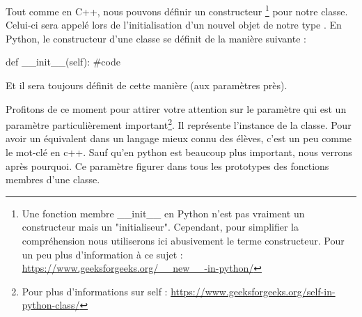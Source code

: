 Tout comme en C++, nous pouvons définir un constructeur
\footnote
{
Une fonction membre \_\_init\_\_ en Python n'est pas vraiment un constructeur mais un "initialiseur". Cependant, pour simplifier la compréhension nous utiliserons ici abusivement le terme constructeur. Pour un peu plus d'information à ce sujet : \url{https://www.geeksforgeeks.org/__new__-in-python/}
}
pour notre classe. Celui-ci sera appelé lors de l'initialisation d'un nouvel objet de notre type .\newline
En Python, le constructeur d'une classe se définit de la manière suivante :
\begin{pyCode}
def __init__(self):
    #code
\end{pyCode}
Et il sera toujours définit de cette manière (aux paramètres près).\smallSkip

Profitons de ce moment pour attirer votre attention sur le paramètre \textcolor{red}{} qui est un paramètre particulièrement important\footnote{Pour plus d'informations sur self : \url{https://www.geeksforgeeks.org/self-in-python-class/}}. Il représente l'instance de la classe. Pour avoir un équivalent dans un langage mieux connu des élèves, c'est un peu comme le mot-clé  en c++. Sauf qu'en python \textcolor{red}{} est beaucoup plus important, nous verrons après pourquoi.\newline
Ce paramètre \textcolor{red}{} figurer dans tous les prototypes des fonctions membres d'une classe.\smallSkip

